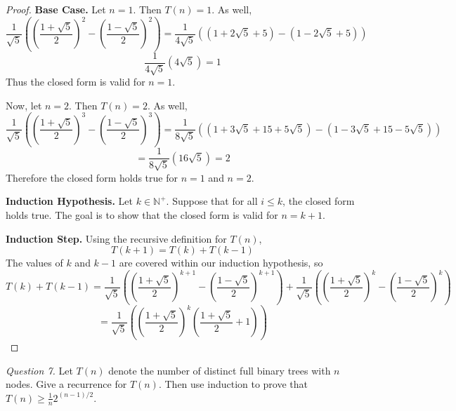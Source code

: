 \documentclass[11pt]{article}
\begin{document}
\begin{enumerate}[label=(\alph*)]
\begin{proof}
            \textbf{Base Case.} Let \(n=1\). Then \(T(n) = 1\). As well,
            \[
                \frac{1}{\sqrt{5}}\left(\left(\frac{1+\sqrt{5}}{2}\right)^{2} - \left(\frac{1-\sqrt{5}}{2}\right)^{2}\right) = \frac{1}{4\sqrt{5}}((1+2\sqrt{5} +5) - (1-2\sqrt{5} +5))
            \]
            \[
                \frac{1}{4\sqrt{5}}(4\sqrt{5}) = 1
            \]
            Thus the closed form is valid for \(n=1\).

            Now, let \(n=2\). Then \(T(n)=2\). As well,
            \[
                \frac{1}{\sqrt{5}}\left(\left(\frac{1+\sqrt{5}}{2}\right)^{3} - \left(\frac{1-\sqrt{5}}{2}\right)^{3}\right) = \frac{1}{8\sqrt{5}}((1+3\sqrt{5} + 15 + 5\sqrt{5}) - (1 - 3\sqrt{5} + 15 - 5\sqrt{5}))
            \]
            \[
                = \frac{1}{8\sqrt{5}}(16\sqrt{5}) = 2
            \]
            Therefore the closed form holds true for \(n=1\) and \(n=2\).

            \textbf{Induction Hypothesis.} Let \(k \in \mathbb{N}^+\). Suppose that for all \(i \leq k\), the closed form holds true. The goal is to show that the closed form is valid for \(n=k+1\).

            \textbf{Induction Step.} Using the recursive definition for \(T(n)\),
            \[
                T(k+1) = T(k) + T(k-1)
            \]
            The values of \(k\) and \(k-1\) are covered within our induction hypothesis, so
            \[
                T(k) + T(k-1) = \frac{1}{\sqrt{5}}\left(\left(\frac{1+\sqrt{5}}{2}\right)^{k+1} - \left(\frac{1-\sqrt{5}}{2}\right)^{k+1}\right) + \frac{1}{\sqrt{5}}\left(\left(\frac{1+\sqrt{5}}{2}\right)^{k} - \left(\frac{1-\sqrt{5}}{2}\right)^{k}\right)
            \]
            \[
                = \frac{1}{\sqrt{5}}\left( \left(\frac{1+\sqrt{5}}{2}\right)^k \left( \frac{1+\sqrt{5}}{2} + 1\right)   \right) 
            \]
        \end{proof}
    \end{enumerate}

    \textit{Question 7.} Let \(T(n)\) denote the number of distinct full binary trees with \(n\) nodes. Give a recurrence for \(T(n)\). Then use induction to prove that \(T(n)\geq \frac{1}{n}2^{(n-1) / 2}\).
\end{document}
